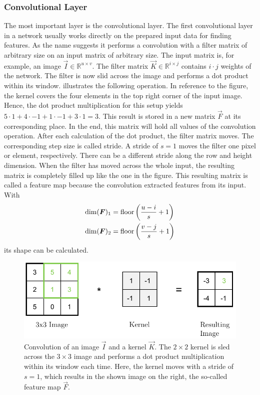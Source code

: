 \subsubsection{Convolutional Layer}
\label{sec:cnn-convolutional-layer}
The most important layer is the convolutional layer.
The first convolutional layer in a network usually works directly on the prepared input data for finding features.
As the name suggests it performs a convolution with a filter matrix of arbitrary size on an input matrix of arbitrary size.
The input matrix is, for example, an image $\vec{I} \in \mathbb{R}^{u \times v}$.
The filter matrix $\vec{K} \in \mathbb{R}^{i \times j}$ contains $i \cdot j$ weights of the network.
The filter is now slid across the image and performs a dot product within its window.
 illustrates the following operation.
In reference to the figure, the kernel covers the four elements in the top right corner of the input image.
Hence, the dot product multiplication for this setup yields $5 \cdot 1+4 \cdot -1+1 \cdot -1+3 \cdot 1=3$.
This result is stored in a new matrix $\vec{F}$ at its corresponding place.
In the end, this matrix will hold all values of the convolution operation.
After each calculation of the dot product, the filter matrix moves.
The corresponding step size is called stride.
A stride of $s=1$ moves the filter one pixel or element, respectively.
There can be a different stride along the row and height dimension.
When the filter has moved across the whole input, the resulting matrix is completely filled up like the one in the figure.
This resulting matrix is called a feature map because the convolution extracted features from its input.
With
\begin{subequations}
	\label{eq:feature-map-shape}
	\begin{align}
		\dim(\bm{F})_1 &= \operatorname{floor} \left( \frac{u - i}{s}+1 \right) \\
		\dim(\bm{F})_2 &= \operatorname{floor} \left( \frac{v - j}{s}+1 \right)
	\end{align}
\end{subequations}
its shape can be calculated.
\begin{figure}
	\centering
	\includegraphics{images/convolution.pdf}
	\caption[Convolution of an image with a kernel]{Convolution of an image $\vec{I}$ and a kernel $\vec{K}$. The $2 \times 2$ kernel is sled across the $3 \times 3$ image and performs a dot product multiplication within its window each time. Here, the kernel moves with a stride of $s=1$, which results in the shown image on the right, the so-called feature map $\vec{F}$.}
	\label{fig:convolution}
\end{figure}

